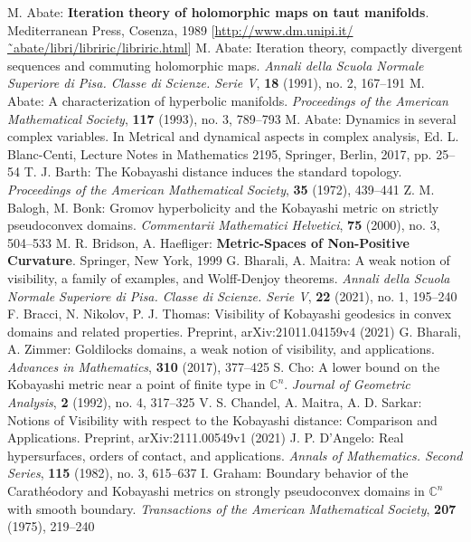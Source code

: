 \begin{thebibliography}{widest entry}
   M. Abate: \textbf{Iteration theory of holomorphic maps on taut manifolds}. Mediterranean Press, Cosenza, 1989 [\url{http://www.dm.unipi.it/˜abate/libri/libriric/libriric.html}]
   M. Abate: Iteration theory, compactly divergent sequences and commuting holomorphic maps. \textit{Annali della Scuola Normale Superiore di Pisa. Classe di Scienze. Serie V}, \textbf{18} (1991), no. 2, 167--191
   M. Abate: A characterization of hyperbolic manifolds. \textit{Proceedings of the American Mathematical Society}, \textbf{117} (1993), no. 3, 789--793
   M. Abate: Dynamics in several complex variables. In Metrical and dynamical aspects in complex analysis, Ed. L. Blanc-Centi, Lecture Notes in Mathematics 2195, Springer, Berlin, 2017, pp. 25--54
   T. J. Barth: The Kobayashi distance induces the standard topology. \textit{Proceedings of the American Mathematical Society}, \textbf{35} (1972), 439--441
   Z. M. Balogh, M. Bonk: Gromov hyperbolicity and the Kobayashi metric on strictly pseudoconvex domains. \textit{Commentarii Mathematici Helvetici}, \textbf{75} (2000), no. 3, 504--533
   M. R. Bridson, A. Haefliger: \textbf{Metric-Spaces of Non-Positive Curvature}. Springer, New York, 1999
   G. Bharali, A. Maitra: A weak notion of visibility, a family of examples, and Wolff-Denjoy theorems. \textit{Annali della Scuola Normale Superiore di Pisa. Classe di Scienze. Serie V}, \textbf{22} (2021), no. 1, 195--240
   F. Bracci, N. Nikolov, P. J. Thomas: Visibility of Kobayashi geodesics in convex domains and related properties. Preprint, arXiv:21011.04159v4 (2021)
   G. Bharali, A. Zimmer: Goldilocks domains, a weak notion of visibility, and applications. \textit{Advances in Mathematics}, \textbf{310} (2017), 377--425
   S. Cho: A lower bound on the Kobayashi metric near a point of finite type in $\mathbb{C}^n$. \textit{Journal of Geometric Analysis}, \textbf{2} (1992), no. 4, 317--325
   V. S. Chandel, A. Maitra, A. D. Sarkar: Notions of Visibility with respect to the Kobayashi distance: Comparison and Applications. Preprint, arXiv:2111.00549v1 (2021)
   J. P. D'Angelo: Real hypersurfaces, orders of contact, and applications. \textit{Annals of Mathematics. Second Series}, \textbf{115} (1982), no. 3, 615--637
   I. Graham: Boundary behavior of the Carathéodory and Kobayashi metrics on strongly pseudoconvex domains in $\mathbb{C}^n$ with smooth boundary. \textit{Transactions of the American Mathematical Society}, \textbf{207} (1975), 219--240

\end{thebibliography}
